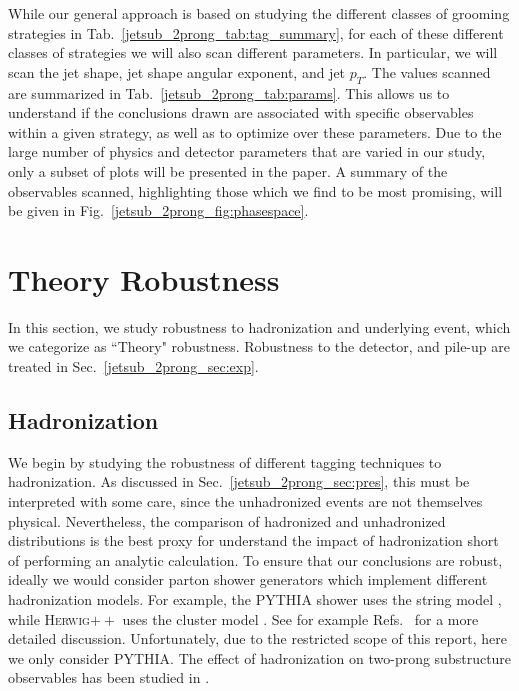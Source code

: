 \documentclass[11pt,letterpaper]{article}
\begin{document}
While our general approach is based on studying the different classes of grooming strategies in Tab.~\ref{jetsub_2prong_tab:tag_summary}, for each of these different classes of strategies we will also scan different parameters.
%
In particular, we will scan the jet shape, jet shape angular exponent, and jet $p_T$.
%
The values scanned are summarized in Tab.~\ref{jetsub_2prong_tab:params}.
%
This allows us to understand if the conclusions drawn are associated with specific observables within a given strategy, as well as to optimize over these parameters.
%
Due to the large number of physics and detector parameters that are varied in our study, only a subset of plots will be presented in the paper. A summary of the observables scanned, highlighting those which we find to be most promising, will be given in Fig.~\ref{jetsub_2prong_fig:phasespace}.
%






\section{Theory Robustness}\label{jetsub_2prong_sec:np}


In this section, we study robustness to hadronization and underlying event, which we categorize as ``Theory" robustness. Robustness to the detector, and pile-up are treated in Sec.~\ref{jetsub_2prong_sec:exp}. 




\subsection{Hadronization}\label{jetsub_2prong_sec:hadr}








We begin by studying the robustness of different tagging techniques to hadronization.
%
As discussed in Sec.~\ref{jetsub_2prong_sec:pres}, this must be interpreted with some care, since the unhadronized events are not themselves physical.
%
Nevertheless, the comparison of hadronized and unhadronized distributions is the best proxy for understand the impact of hadronization short of performing an analytic calculation.
%
To ensure that our conclusions are robust, ideally we would consider parton shower generators which implement different hadronization models.
%
For example, the \textsc{PYTHIA} shower uses the string model \cite{Andersson:1983ia,Andersson:1998tv}, while \textsc{Herwig}$++$ uses the cluster model \cite{Webber:1983if,Marchesini:1987cf}.
%
See for example Refs.~\cite{Buckley:2011ms,Skands:2011pf,Skands:2012ts} for a more detailed discussion.
%
Unfortunately, due to the restricted scope of this report, here we only consider \textsc{PYTHIA}.
%
The effect of hadronization on two-prong substructure observables has been studied in \cite{Larkoski:2015kga,Salam:2016yht,Larkoski:2017iuy,Larkoski:2017cqq}.
\end{document}
